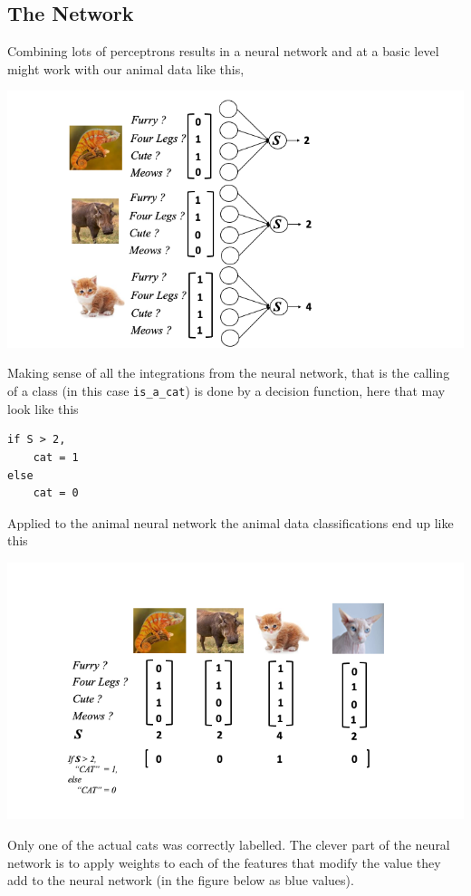 \documentclass[
]{book}
\begin{document}
\hypertarget{the-network}{%
\subsection{The Network}\label{the-network}}

Combining lots of perceptrons results in a neural network and at a basic level might work with our animal data like this,

\includegraphics{figs/percepwts/Slide2.png}

Making sense of all the integrations from the neural network, that is the calling of a class (in this case \texttt{is\_a\_cat}) is done by a decision function, here that may look like this

\begin{verbatim}
if S > 2,
    cat = 1
else 
    cat = 0
\end{verbatim}

Applied to the animal neural network the animal data classifications end up like this

\includegraphics{figs/percepwts/Slide3.png}

Only one of the actual cats was correctly labelled. The clever part of the neural network is to apply weights to each of the features that modify the value they add to the neural network (in the figure below as blue values).
\end{document}
